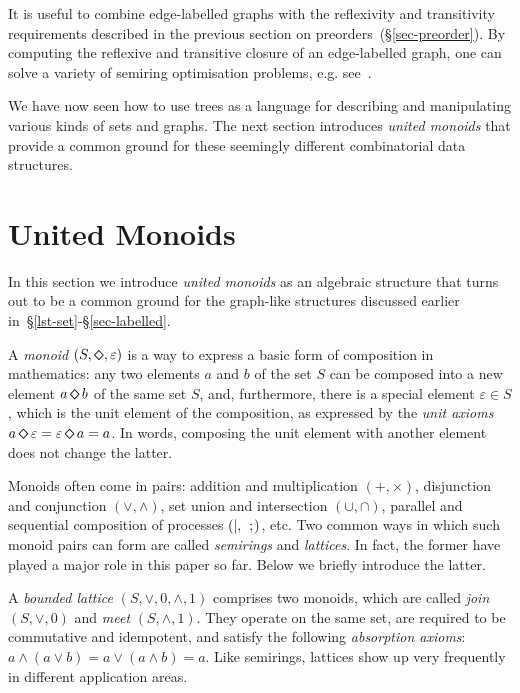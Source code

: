 \documentclass[english,submission]{programming}
\newcommand{\code}[1]{\lstinline[mathescape]|#1|}
\newcommand{\dia}{\,\text{\raisebox{-0.3mm}{\Large $\diamond$}}\,}
\newcommand{\ldia}{\text{\raisebox{-0.3mm}{\Large $\diamond$}}}
\begin{document}
\noindent
It is useful to combine edge-labelled graphs with the reflexivity and
transitivity requirements described in the previous section on
preorders~(\S\ref{sec-preorder}). By computing the reflexive and transitive
closure of an edge-labelled graph, one can solve a variety of semiring
optimisation problems, e.g. see~\cite{2013_semirings_dolan}.

We have now seen how to use trees as a language for describing and manipulating
various kinds of sets and graphs. The next section introduces \emph{united
monoids} that provide a common ground for these seemingly different
combinatorial data structures.

\section{United Monoids}\label{sec-united}

In this section we introduce \emph{united monoids} as an algebraic structure
that turns out to be a common ground for the graph-like structures
discussed earlier in~\S\ref{lst-set}-\S\ref{sec-labelled}.

A \emph{monoid} $(S, \ldia, \varepsilon)$ is a way to express a basic form of
composition in mathematics: any two elements $a$ and $b$ of the set $S$ can be
composed into a new element $a \dia b$ of the same set $S$, and, furthermore,
there is a special element $\varepsilon \in S$, which is the unit element of the
composition, as expressed by the \emph{unit axioms}
$a \dia \varepsilon = \varepsilon \dia a = a$. In words, composing the unit
element with another element does not change the latter.

\noindent
Monoids often come in pairs: addition and multiplication $(+, \times)$,
disjunction and conjunction $(\vee, \wedge)$, set union and intersection
$(\cup, \cap)$, parallel and sequential composition of processes
$(\text{\code{|}},\ \text{\code{;}})$, etc. Two common ways in which such monoid
pairs can form are called \emph{semirings} and \emph{lattices}. In fact, the
former have played a major role in this paper so far. Below we briefly introduce
the latter.

A \emph{bounded lattice} $(S, \vee, 0, \wedge, 1)$ comprises two monoids, which
are called \emph{join} $(S, \vee, 0)$ and \emph{meet} $(S, \wedge, 1)$. They
operate on the same set, are required to be commutative and idempotent, and
satisfy the following \emph{absorption axioms}: $a \wedge (a \vee b) = a \vee (a \wedge b) = a$. Like semirings, lattices show up very frequently in different application
areas.
\end{document}
